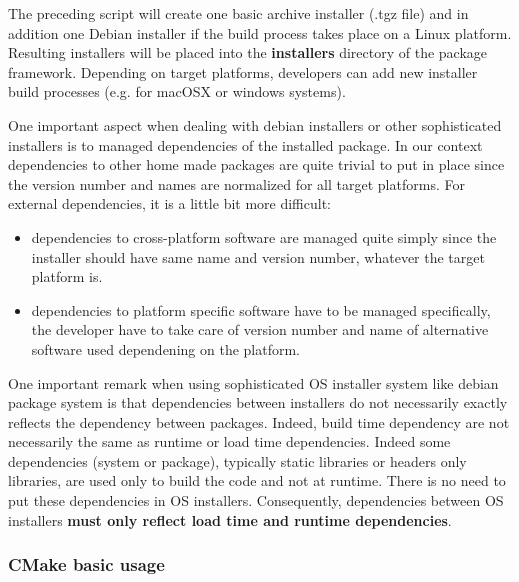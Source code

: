 \documentclass[12pt,a4paper]{article}
\begin{document}
The preceding script will create one basic archive installer (.tgz file) and in addition one Debian installer if the build process takes place on a Linux platform. Resulting installers will be placed into the \textbf{installers} directory of the package framework. Depending on target platforms, developers can add new installer build processes (e.g. for macOSX or windows systems).

One important aspect when dealing with debian installers or other sophisticated installers is to managed dependencies of the installed package. In our context dependencies to other home made packages are quite trivial to put in place since the version number and names are normalized for all target platforms. For external dependencies, it is a little bit more difficult:
\begin{itemize}
\item dependencies to cross-platform software are managed quite simply since the installer should have same name and version number, whatever the target platform is.
\item dependencies to platform specific software have to be managed specifically, the developer have to take care of version number and name of alternative software used dependening on the platform.
\end{itemize}

One important remark when using sophisticated OS installer system like debian package system is that dependencies between installers do not necessarily exactly reflects the dependency between packages. Indeed, build time dependency are not necessarily the same as runtime or load time dependencies. Indeed some  dependencies (system or package), typically static libraries or headers only libraries, are used only to build the code and not at runtime. There is no need to put these dependencies in OS installers. Consequently,  dependencies between OS installers \textbf{must only reflect load time and runtime dependencies}. 

\subsubsection{CMake basic usage}
\end{document}
